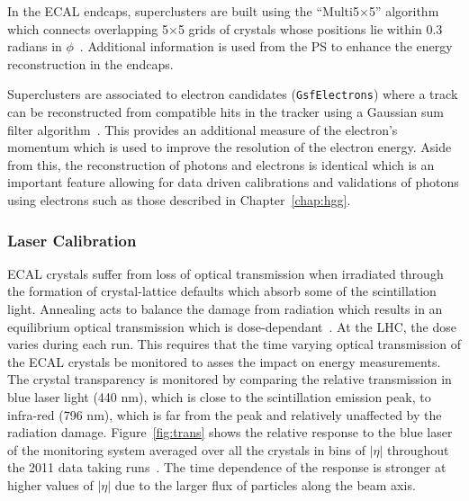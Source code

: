 In the ECAL endcaps, superclusters are built using the ``Multi5$\times$5'' algorithm which 
connects overlapping 5$\times$5 grids of crystals whose positions lie within 
0.3 radians in $\phi$~\citep{AN-09-164}. 
Additional information is used from the PS to enhance the energy reconstruction in the endcaps. 

Superclusters are associated to electron candidates (\texttt{GsfElectrons}) 
where a track can be reconstructed from
compatible hits in the tracker using a Gaussian sum filter algorithm~\citep{GSF_Electron_Reconstruction_CMS}.  
This provides an additional measure of the electron's momentum which is used 
to improve the resolution of the electron energy.
Aside from this, the reconstruction of photons and electrons is identical which is an 
important feature allowing for data driven calibrations and validations of photons using 
electrons such as those described in Chapter~\ref{chap:hgg}.


\subsubsection{Laser Calibration}

ECAL crystals suffer from loss of optical transmission when irradiated through 
the formation of crystal-lattice defaults which absorb some of the scintillation light. Annealing
acts to balance the damage from radiation which results in an equilibrium optical 
transmission which is dose-dependant~\citep{TDR1}. 
At the LHC, the dose varies during each run. This requires that the time varying optical transmission of the ECAL 
crystals be monitored to asses the impact on energy measurements.
The crystal transparency is monitored by comparing the relative transmission in blue laser light (440 nm), 
which is close to the scintillation emission peak, to infra-red (796 nm), which is far from the 
peak and relatively unaffected by the radiation damage.
Figure~\ref{fig:trans} shows the relative response to the blue laser of the monitoring system
averaged over all the crystals in bins of $|\eta|$ throughout the 2011 data taking 
runs~\citep{CMS-DP-2012-007}. 
The time dependence of the response is stronger at higher values of $|\eta|$ due to the larger flux
of particles along the beam axis.

